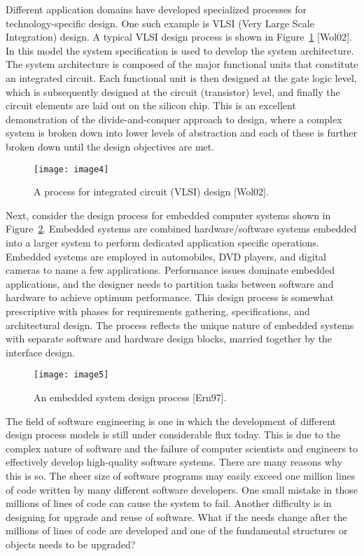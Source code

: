 Different application domains have developed specialized processes for
technology-specific design. One such example is VLSI (Very Large Scale
Integration) design. A typical VLSI design process is shown in Figure~\ref{figure:VLSIdesign}
 {[}Wol02{]}. In this model the system specification is used to
develop the system architecture. The system architecture is composed of
the major functional units that constitute an integrated circuit. Each
functional unit is then designed at the gate logic level, which is
subsequently designed at the circuit (transistor) level, and finally the
circuit elements are laid out on the silicon chip. This is an excellent
demonstration of the divide-and-conquer approach to design, where a
complex system is broken down into lower levels of abstraction and each
of these is further broken down until the design objectives are met.

\begin{figure}[h]
 \texttt{[image: image4]}
\caption{A process for integrated circuit (VLSI) design {[}Wol02{]}.}
\label{figure:VLSIdesign}
\end{figure}

Next, consider the design process for embedded computer systems shown in
Figure~\ref{figure:embedded DesignProcess}. 
Embedded systems are combined hardware/software systems
embedded into a larger system to perform dedicated application specific
operations. Embedded systems are employed in automobiles, DVD players,
and digital cameras to name a few applications. Performance issues
dominate embedded applications, and the designer needs to partition
tasks between software and hardware to achieve optimum performance. This
design process is somewhat prescriptive with phases for requirements
gathering, specifications, and architectural design. The process
reflects the unique nature of embedded systems with separate software
and hardware design blocks, married together by the interface design.

\begin{figure}[h]
\texttt{[image: image5]}
\caption{An embedded system design process {[}Ern97{]}.}
\label{figure:embedded DesignProcess}
\end{figure}

The field of software engineering is one in which the development of
different design process models is still under considerable flux today.
This is due to the complex nature of software and the failure of
computer scientists and engineers to effectively develop high-quality
software systems. There are many reasons why this is so. The sheer size
of software programs may easily exceed one million lines of code written
by many different software developers. One small mistake in those
millions of lines of code can cause the system to fail. Another
difficulty is in designing for upgrade and reuse of software. What if
the needs change after the millions of lines of code are developed and
one of the fundamental structures or objects needs to be upgraded?

